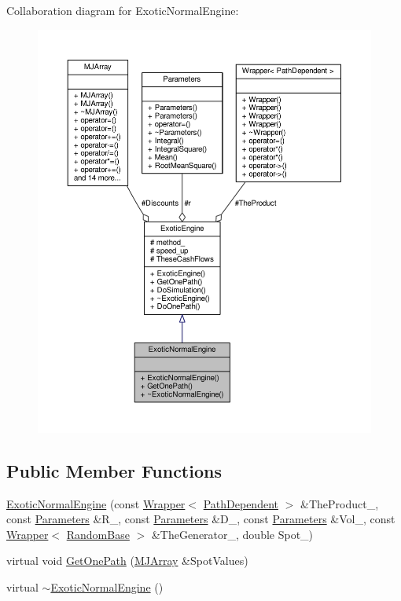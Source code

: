 Collaboration diagram for Exotic\+Normal\+Engine\+:
\nopagebreak
\begin{figure}[H]
\begin{center}
\leavevmode
\includegraphics[width=350pt]{classExoticNormalEngine__coll__graph}
\end{center}
\end{figure}
\subsection*{Public Member Functions}
\begin{DoxyCompactItemize}
\item 
\hyperlink{classExoticNormalEngine_a3a303c603779c8760aa2c7dc45829a8f}{Exotic\+Normal\+Engine} (const \hyperlink{classWrapper}{Wrapper}$<$ \hyperlink{classPathDependent}{Path\+Dependent} $>$ \&The\+Product\+\_\+, const \hyperlink{classParameters}{Parameters} \&R\+\_\+, const \hyperlink{classParameters}{Parameters} \&D\+\_\+, const \hyperlink{classParameters}{Parameters} \&Vol\+\_\+, const \hyperlink{classWrapper}{Wrapper}$<$ \hyperlink{classRandomBase}{Random\+Base} $>$ \&The\+Generator\+\_\+, double Spot\+\_\+)
\item 
virtual void \hyperlink{classExoticNormalEngine_ab86b50858bc7159d23d18b8f692651d5}{Get\+One\+Path} (\hyperlink{classMJArray}{M\+J\+Array} \&Spot\+Values)
\item 
virtual \hyperlink{classExoticNormalEngine_ab8c6d958414dad93d33895804027b690}{$\sim$\+Exotic\+Normal\+Engine} ()
\end{DoxyCompactItemize}
